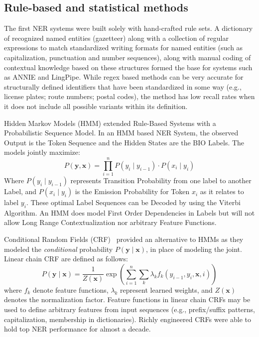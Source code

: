 \subsection{Rule-based and statistical methods}
\label{sec:rulebased}

The first NER systems were built solely with hand-crafted rule sets. A dictionary of recognized named entities (gazetteer) along with a collection of regular expressions to match standardized writing formats for named entities (such as capitalization, punctuation and number sequences), along with manual coding of contextual knowledge based on these structures formed the base for systems such as ANNIE and LingPipe. While regex based methods can be very accurate for structurally defined identifiers that have been standardized in some way (e.g., license plates; route numbers; postal codes), the method has low recall rates when it does not include all possible variants within its definition.

Hidden Markov Models (HMM)  extended Rule-Based Systems with a Probabilistic Sequence Model. In an HMM based NER System, the observed Output is the Token Sequence and the Hidden States are the BIO Labels. The models jointly maximize:
\begin{equation}
  P(\mathbf{y}, \mathbf{x}) = \prod_{i=1}^{n} P(y_i \mid y_{i-1}) \cdot P(x_i \mid y_i)
\end{equation}
Where $P(y_i \mid y_{i-1})$ represents Transition Probability from one label to another Label, and $P(x_i \mid y_i)$ is the Emission Probability for Token $x_i$ as it relates to label $y_i$. These optimal Label Sequences can be Decoded by using the Viterbi Algorithm. An HMM does model First Order Dependencies in Labels but will not allow Long Range Contextualization nor arbitrary Feature Functions.


Conditional Random Fields (CRF)~\cite{lafferty2001crf} provided an alternative to HMMs as they modeled the \textit{conditional} probability $P(\mathbf{y} \mid \mathbf{x})$, in place of modeling the joint. Linear chain CRF are defined as follows:
\begin{equation}
  P(\mathbf{y} \mid \mathbf{x}) = \frac{1}{Z(\mathbf{x})} \exp\!\left(\sum_{i=1}^{n} \sum_{k} \lambda_k f_k(y_{i-1}, y_i, \mathbf{x}, i)\right)
\end{equation}
where $f_k$ denote feature functions, $\lambda_k$ represent learned weights, and $Z(\mathbf{x})$ denotes the normalization factor.
Feature functions in linear chain CRFs may be used to define arbitrary features from input sequences (e.g., prefix/suffix patterns, capitalization, membership in dictionaries). Richly engineered CRFs were able to hold top NER performance for almost a decade.


